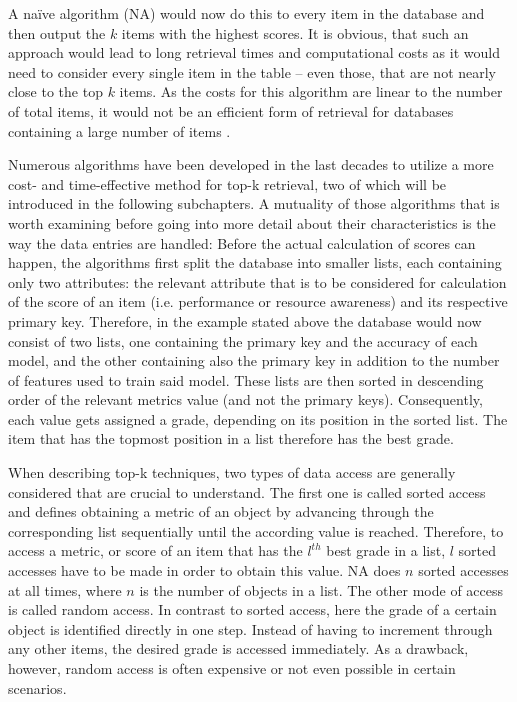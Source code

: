 A naïve algorithm (NA) would now do this to every item in the database and then output the $k$ items with the highest scores. It is obvious, that such an approach would lead to long retrieval times and computational costs as it would need to consider every single item in the table – even those, that are not nearly close to the top $k$ items. As the costs for this algorithm are linear to the number of total items, it would not be an efficient form of retrieval for databases containing a large number of items \cite{fagin2002}.

Numerous algorithms have been developed in the last decades to utilize a more cost- and time-effective method for top-k retrieval, two of which will be introduced in the following subchapters. A mutuality of those algorithms that is worth examining before going into more detail about their characteristics is the way the data entries are handled: Before the actual calculation of scores can happen, the algorithms first split the database into smaller lists, each containing only two attributes: the relevant attribute that is to be considered for calculation of the score of an item (i.e. performance or resource awareness) and its respective primary key. Therefore, in the example stated above the database would now consist of two lists, one containing the primary key and the accuracy of each model, and the other containing also the primary key in addition to the number of features used to train said model. These lists are then sorted in descending order of the relevant metrics value (and not the primary keys). Consequently, each value gets assigned a grade, depending on its position in the sorted list. The item that has the topmost position in a list therefore has the best grade.

When describing top-k techniques, two types of data access are generally considered that are crucial to understand. The first one is called sorted access and defines obtaining a metric of an object by advancing through the corresponding list sequentially until the according value is reached. Therefore, to access a metric, or score of an item that has the $l^{th}$ best grade in a list, $l$ sorted accesses have to be made in order to obtain this value. NA does $n$ sorted accesses at all times, where $n$ is the number of objects in a list. The other mode of access is called random access. In contrast to sorted access, here the grade of a certain object is identified directly in one step. Instead of having to increment through any other items, the desired grade is accessed immediately. As a drawback, however, random access is often expensive or not even possible in certain scenarios.

